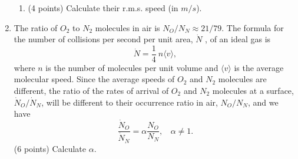 \documentclass[fleqn]{article}
\begin{document}
\begin{enumerate}
\begin{enumerate}

        \item (4 points) Calculate their r.m.s. speed (in $m/s$).


      \end{enumerate}

    \item The ratio of $O_2$ to $N_2$ molecules in air is $N_O/ N_N \approx 21/79.$
    The formula for the number of collisions per second per unit area, $\dot{N}$ , of an ideal gas is
    $$
      \dot{N}=\dfrac{1}{4} ~ n \langle v \rangle,
    $$
    where $n$ is the number of molecules per unit volume and $\langle v \rangle$ is the average molecular speed.
    Since the average speeds of $O_2$ and $N_2$ molecules are different, the ratio of the rates of arrival
    of $O_2$ and $N_2$ molecules at a surface, $\dot{N}_O/\dot{N}_N$, will be different to their occurrence ratio in air,
    $N_O/ N_N$, and we have
    $$
      \dfrac{\dot{N}_O}{\dot{N}_N}=\alpha \dfrac{N_O}{N_N}, ~~~~ \alpha \neq 1.
    $$
    (6 points) Calculate $\alpha$.


  \end{enumerate}
\end{document}
